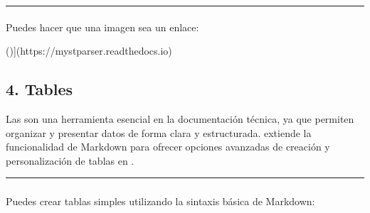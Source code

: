 \documentclass[a4paper,10pt,oneside,spanish,openany]{sphinxmanual}
\begin{document}
\bigskip\hrule\bigskip



\paragraph{}
\label{\detokenize{configuracion_inicial/013.guia_de_myst_parser:enlazar-imagenes}}
\sphinxAtStartPar
Puedes hacer que una imagen sea un enlace:

\begin{sphinxVerbatim}[commandchars=\\\{\}]
[\PYG{n+nt}{![Logo de MyST}]()](https://myst\PYGZhy{}parser.readthedocs.io)
\end{sphinxVerbatim}

\sphinxAtStartPar
{}

\sphinxAtStartPar
{}


\subsection{4. Tables}
\label{\detokenize{configuracion_inicial/013.guia_de_myst_parser:tables}}
\sphinxAtStartPar
Las  son una herramienta esencial en la documentación técnica, ya que permiten organizar y presentar datos de forma clara y estructurada.  extiende la funcionalidad de Markdown para ofrecer opciones avanzadas de creación y personalización de tablas en .


\bigskip\hrule\bigskip



\subsubsection{}
\label{\detokenize{configuracion_inicial/013.guia_de_myst_parser:tablas-basicas-en-myst-parser}}

\paragraph{}
\label{\detokenize{configuracion_inicial/013.guia_de_myst_parser:sintaxis-basica-de-tablas-markdown}}
\sphinxAtStartPar
Puedes crear tablas simples utilizando la sintaxis básica de Markdown:
\end{document}
